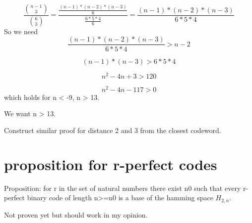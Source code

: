 \[
\frac{\binom{n-1}{3}}{\binom{6}{3}} = \frac{\frac{(n-1)*(n-2)*(n-3)}{6}}{\frac{6*5*4}{6}} = \frac{(n-1)*(n-2)*(n-3)}{6*5*4}
\]
So we need 
\[
\frac{(n-1)*(n-2)*(n-3)}{6*5*4} > n-2
\]

\[
(n-1)*(n-3) > 6*5*4
\]

\[
n^2-4n+3 > 120
\]

\[
n^2-4n-117 > 0
\]
which holds for n < -9, n > 13. 

We want n > 13. 

Construct similar proof for distance 2 and 3 from the closest codeword.

\section{proposition for r-perfect codes}
Proposition: for r in the set of natural numbers there exist n0 such that every r-perfect binary code of length n>=n0 is a base of the hamming space $H_{2,n}$.

Not proven yet but should work in my opinion.

